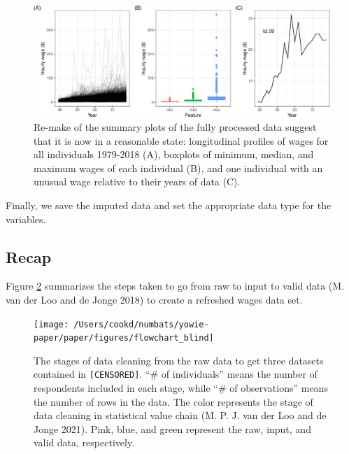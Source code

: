 \documentclass{article}
\begin{document}
\begin{figure}

{\centering \includegraphics[width=1\linewidth]{figures/fixed-feature-plot-1} 

}

\caption{Re-make of the summary plots of the fully processed data suggest that it is now in a reasonable state: longitudinal profiles of wages for all individuals 1979-2018 (A), boxplots of minimum, median, and maximum wages of each individual (B), and one individual with an unusual wage relative to their years of data (C). }\label{fig:fixed-feature-plot}
\end{figure}

Finally, we save the imputed data and set the appropriate data type for the variables.

\hypertarget{recap}{%
\subsection{Recap}\label{recap}}

Figure \ref{fig:flow-chart-blind} summarizes the steps taken to go from raw to input to valid data (M. van der Loo and de Jonge 2018) to create a refreshed wages data set.



\begin{figure}

{\centering \texttt{[image: /Users/cookd/numbats/yowie-paper/paper/figures/flowchart\_blind]} 

}

\caption{The stages of data cleaning from the raw data to get three datasets contained in \texttt{[CENSORED]}. ``\# of individuals'' means the number of respondents included in each stage, while ``\# of observations'' means the number of rows in the data. The color represents the stage of data cleaning in statistical value chain (M. P. J. van der Loo and de Jonge 2021). Pink, blue, and green represent the raw, input, and valid data, respectively.}\label{fig:flow-chart-blind}
\end{figure}
\end{document}
